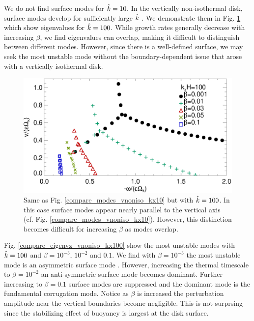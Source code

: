 We do not find surface modes for $\hat{k}=10$. In the vertically
non-isothermal disk, surface modes develop for sufficiently large 
$\hat{k}$ \citep{barker15}. We demonstrate them in
Fig. \ref{compare_modes_vnoniso_kx100} which show eigenvalues for
$\hat{k}=100$. While growth rates generally decrease with increasing 
$\beta$, we find eigenvalues can overlap, making it difficult to 
distinguish between different modes. However, since there 
is a well-defined surface, we may seek the 
most unstable mode without the boundary-dependent issue that arose 
with a vertically isothermal disk.  

\begin{figure}
  \includegraphics[width=\linewidth,clip=true,trim=0cm 0cm 0cm
  0cm]{figures/compare_modes_Gam1.084_kx100.ps}
  \caption{Same as Fig. \ref{compare_modes_vnoniso_kx10} but with
    $\hat{k}=100$. In this case surface modes appear nearly parallel to
    the vertical axis
    (cf. Fig. \ref{compare_modes_vnoniso_kx10}). However, this
    distinction becomes difficult for increasing $\beta$ as modes
    overlap. 
    \label{compare_modes_vnoniso_kx100}}
\end{figure}

Fig. \ref{compare_eigenvz_vnoniso_kx100} show the most unstable modes
with $\hat{k}=100$ and $\beta=10^{-3},\, 10^{-2}$ and
$0.1$. We find with $\beta=10^{-3}$ the most 
unstable mode is an asymmetric surface mode \citep[also seen in Fig. 7
of][]{barker15}. However, increasing the thermal timescale to
$\beta=10^{-2}$ an anti-symmetric surface mode becomes
dominant. Further increasing to $\beta=0.1$ surface modes are
suppressed and the dominant mode is the fundamental corrugation
mode. Notice as $\beta$ is increased the perturbation amplitude near
the vertical boundaries become negligible. This is not surprsing since
the stabilizing effect of buoyancy is largest at the disk surface. 

